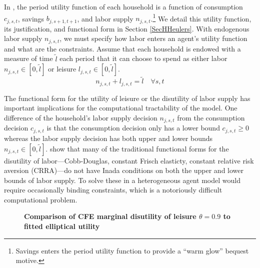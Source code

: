   In \ogindia, the period utility function of each household is a function of consumption $c_{j,s,t}$, savings $b_{j,s+1,t+1}$, and labor supply $n_{j,s,t}$.\footnote{Savings enters the period utility function to provide a ``warm glow'' bequest motive.} We detail this utility function, its justification, and functional form in Section \ref{SecHHeulers}. With endogenous labor supply $n_{j,s,t}$, we must specify how labor enters an agent's utility function and what are the constraints. Assume that each household is endowed with a measure of time $\tilde{l}$ each period that it can choose to spend as either labor $n_{j,s,t}\in[0,\tilde{l}]$ or leisure $l_{j,s,t}\in[0,\tilde{l}]$.
  \begin{equation}\label{EqLabConstr}
    n_{j,s,t} + l_{j,s,t} = \tilde{l} \quad\forall s, t
  \end{equation}

  The functional form for the utility of leisure or the disutility of labor supply has important implications for the computational tractability of the model. One difference of the household's labor supply decision $n_{j,s,t}$ from the consumption decision $c_{j,s,t}$ is that the consumption decision only has a lower bound $c_{j,s,t}\geq 0$ whereas the labor supply decision has both upper and lower bounds $n_{j,s,t}\in[0,\tilde{l}]$. \citet{EvansPhillips:2017} show that many of the traditional functional forms for the disutility of labor---Cobb-Douglas, constant Frisch elasticty, constant relative risk aversion (CRRA)---do not have Inada conditions on both the upper and lower bounds of labor supply. To solve these in a heterogeneous agent model would require occasionally binding constraints, which is a notoriously difficult computational problem.

  \begin{figure}[htb]\centering \captionsetup{width=4.0in}
    \caption{\label{FigMDUcompar}\textbf{Comparison of CFE marginal disutility of leisure $\theta=0.9$ to fitted elliptical utility}}
  \end{figure}

